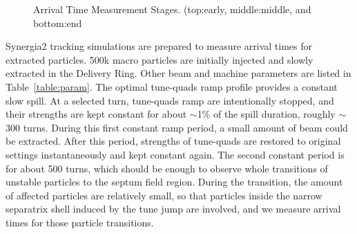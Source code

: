 \documentclass[aps,prstab,onecolumn,preprint]{revtex4-1}
\begin{document}
\begin{figure}[!tbp]
  \caption{\label{fig:arrival1}Arrival Time Measurement Stages. (top:early, middle:middle, and bottom:end}
\end{figure}

Synergia2 tracking simulations are prepared to measure arrival times for extracted particles. 500k macro particles are initially injected and slowly extracted in the Delivery Ring. Other beam and machine parameters are listed in Table~\ref{table:param}. The optimal tune-quads ramp profile provides a constant slow spill. At a selected turn, tune-quads ramp are intentionally stopped, and their strengths are kept constant for about $\sim$1\% of the spill duration, roughly $\sim$300 turns. During this first constant ramp period, a small amount of beam could be extracted. After this period, strengths of tune-quads are restored to original settings instantaneously and kept constant again. The second constant period is for about 500 turns, which should be enough to observe whole transitions of unstable particles to the septum field region. During the transition, the amount of affected particles are relatively small, so that particles inside the narrow separatrix shell induced by the tune jump are involved, and we measure arrival times for those particle transitions. 
\end{document}
